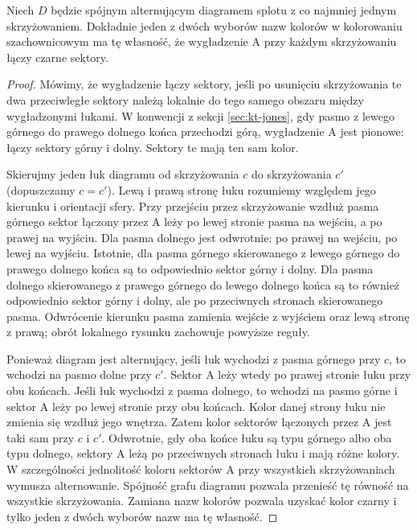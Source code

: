 \begin{lemat}
\label{lem:tg-tait-alternating}
Niech $D$ będzie spójnym alternującym diagramem splotu
z co najmniej jednym skrzyżowaniem. Dokładnie jeden
z dwóch wyborów nazw kolorów w kolorowaniu szachownicowym
ma tę własność, że wygładzenie A przy każdym
skrzyżowaniu łączy czarne sektory.
\end{lemat}
\begin{proof}
Mówimy, że wygładzenie łączy sektory, jeśli po usunięciu
skrzyżowania te dwa przeciwległe sektory należą lokalnie
do tego samego obszaru między wygładzonymi łukami.
W konwencji z sekcji \ref{sec:kt-jones}, gdy pasmo
z lewego górnego do prawego dolnego końca przechodzi
górą, wygładzenie A jest pionowe: łączy sektory górny
i dolny. Sektory te mają ten sam kolor.

Skierujmy jeden łuk diagramu od skrzyżowania $c$ do
skrzyżowania $c'$ (dopuszczamy $c=c'$). Lewą i prawą
stronę łuku rozumiemy względem jego kierunku i orientacji
sfery. Przy przejściu przez skrzyżowanie wzdłuż pasma
górnego sektor łączony przez A leży po lewej stronie
pasma na wejściu, a po prawej na wyjściu. Dla pasma
dolnego jest odwrotnie: po prawej na wejściu, po lewej
na wyjściu. Istotnie, dla pasma górnego skierowanego
z lewego górnego do prawego dolnego końca są to
odpowiednio sektor górny i dolny. Dla pasma dolnego
skierowanego z prawego górnego do lewego dolnego
końca są to również odpowiednio sektor górny i dolny,
ale po przeciwnych stronach skierowanego pasma.
Odwrócenie kierunku pasma zamienia wejście z wyjściem
oraz lewą stronę z prawą; obrót lokalnego rysunku
zachowuje powyższe reguły.

Ponieważ diagram jest alternujący, jeśli łuk wychodzi
z pasma górnego przy $c$, to wchodzi na pasmo dolne
przy $c'$. Sektor A leży wtedy po prawej stronie
łuku przy obu końcach. Jeśli łuk wychodzi z pasma
dolnego, to wchodzi na pasmo górne i sektor A leży
po lewej stronie przy obu końcach. Kolor danej strony
łuku nie zmienia się wzdłuż jego wnętrza. Zatem kolor
sektorów łączonych przez A jest taki sam przy $c$ i $c'$.
Odwrotnie, gdy oba końce łuku są typu górnego albo
oba typu dolnego, sektory A leżą po przeciwnych
stronach łuku i mają różne kolory. W szczególności
jednolitość koloru sektorów A przy wszystkich
skrzyżowaniach wymusza alternowanie.
Spójność grafu diagramu pozwala przenieść tę równość
na wszystkie skrzyżowania. Zamiana nazw kolorów pozwala
uzyskać kolor czarny i tylko jeden z dwóch wyborów nazw
ma tę własność.
\end{proof}

